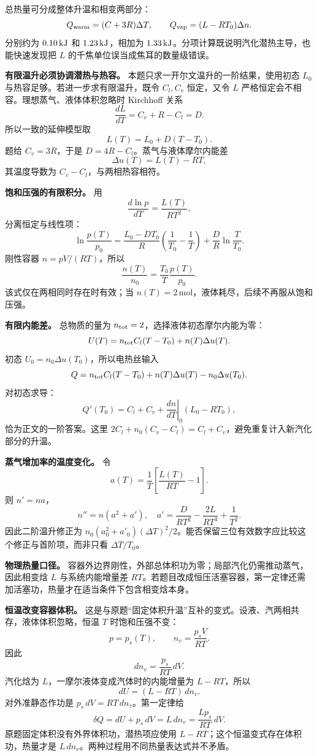 \documentclass[12pt,a4paper,UTF8]{ctexart}
\begin{document}
总热量可分成整体升温和相变两部分： \[
Q_{\rm warm}=(C+3R)\Delta T,
\qquad
Q_{\rm vap}=(L-RT_0)\Delta n.
\] 分别约为 \(0.10\,{\rm kJ}\) 和 \(1.23\,{\rm kJ}\)，相加为
\(1.33\,{\rm kJ}\)。分项计算既说明汽化潜热主导，也能快速发现把 \(L\)
的千焦单位误当成焦耳的数量级错误。

\textbf{有限温升必须协调潜热与热容。}
本题只求一开尔文温升的一阶结果，使用初态 \(L_0\)
与热容足够。若进一步求有限温升，既令 \(C_l,C_v\) 恒定，又令 \(L\)
严格恒定会不相容。理想蒸气、液体体积忽略时 Kirchhoff 关系 \[
\frac{dL}{dT}=C_v+R-C_l=D.
\] 所以一致的延伸模型取 \[
L(T)=L_0+D(T-T_0).
\] 题给 \(C_v=3R\)，于是 \(D=4R-C_l\)。蒸气与液体摩尔内能差 \[
\Delta u(T)=L(T)-RT,
\] 其温度导数为 \(C_v-C_l\)，与两相热容相符。

\textbf{饱和压强的有限积分。} 用 \[
\frac{d\ln p}{dT}=\frac{L(T)}{RT^2},
\] 分离恒定与线性项： \[
\ln\frac{p(T)}{p_0}=
\frac{L_0-DT_0}{R}\left(\frac1{T_0}-\frac1T\right)
+\frac D R\ln\frac T{T_0}.
\] 刚性容器 \(n=pV/(RT)\)，所以 \[
\frac{n(T)}{n_0}=\frac{T_0}{T}\frac{p(T)}{p_0}.
\] 该式仅在两相同时存在时有效；当
\(n(T)=2\,\mathrm{mol}\)，液体耗尽，后续不再服从饱和压强。

\textbf{有限内能差。} 总物质的量为
\(n_{\rm tot}=2\)，选择液体初态摩尔内能为零： \[
U(T)=n_{\rm tot}C_l(T-T_0)+n(T)\Delta u(T).
\] 初态 \(U_0=n_0\Delta u(T_0)\)，所以电热丝输入 \[
Q=n_{\rm tot}C_l(T-T_0)
+n(T)\Delta u(T)-n_0\Delta u(T_0).
\] 对初态求导： \[
Q'(T_0)=C_l+C_v+
\left.\frac{dn}{dT}\right|_0(L_0-RT_0),
\] 恰为正文的一阶答案。这里
\(2C_l+n_0(C_v-C_l)=C_l+C_v\)，避免重复计入新汽化部分的升温。

\textbf{蒸气增加率的温度变化。} 令 \[
a(T)=\frac1T\left[\frac{L(T)}{RT}-1\right].
\] 则 \(n'=na\)， \[
n''=n(a^2+a'),\quad
a'=\frac{D}{RT^2}-\frac{2L}{RT^3}+\frac1{T^2}.
\] 因此二阶温升修正为
\(n_0(a_0^2+a'_0)(\Delta T)^2/2\)。能否保留三位有效数字应比较这个修正与首阶项，而非只看
\(\Delta T/T_0\)。

\textbf{物理热量口径。}
容器外边界刚性，外部总体积功为零；局部汽化仍需推动蒸气，因此相变焓 \(L\)
与系统内能增量差
\(RT\)。若题目改成恒压活塞容器，第一定律还需加活塞功，热量才在适当条件下包含相变焓本身。

\textbf{恒温改变容器体积。}
这是与原题``固定体积升温''互补的变式。设液、汽两相共存，液体体积忽略，恒温
\(T\) 时饱和压强不变： \[
p=p_s(T),\qquad n_v=\frac{p_sV}{RT}.
\] 因此 \[
dn_v=\frac{p_s}{RT}\,dV.
\] 汽化焓为 \(L\)，一摩尔液体变成汽体时的内能增量为 \(L-RT\)，所以 \[
dU=(L-RT)\,dn_v.
\] 对外准静态作功是 \(p_s\,dV=RT\,dn_v\)。第一定律给 \[
\boxed{\delta Q=dU+p_s\,dV=L\,dn_v
=\frac{Lp_s}{RT}\,dV}.
\] 原题固定体积没有外界体积功，潜热项应使用
\(L-RT\)；这个恒温变式存在体积功，热量才是
\(L\,dn_v\)。两种过程用不同热量表达式并不矛盾。
\end{document}

